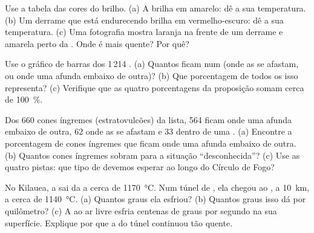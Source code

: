 \begin{exercise}[$\star$]\label{exo:g7:volcanoes:4}
Use a tabela das cores do brilho. (a) A  brilha em amarelo: dê a sua
temperatura. (b) Um derrame que está endurecendo brilha em vermelho-escuro:
dê a sua temperatura. (c) Uma fotografia mostra  laranja na frente de
um derrame e  amarela perto da . Onde é mais quente? Por quê?
\end{exercise}

\begin{exercise}[$\star\star$]\label{exo:g7:volcanoes:5}
Use o gráfico de barras dos 1\,214 . (a) Quantos  ficam num
 (onde as  se afastam, ou onde uma afunda embaixo de
outra)? (b) Que porcentagem de todos os  isso representa?
(c) Verifique que as quatro porcentagens da proposição somam cerca de
100~\%.
\end{exercise}

\begin{exercise}[$\star\star$]\label{exo:g7:volcanoes:6}
Dos 660 cones íngremes (estratovulcões) da lista, 564 ficam onde uma 
afunda embaixo de outra, 62 onde as  se afastam e 33 dentro de uma
. (a) Encontre a porcentagem de cones íngremes que ficam onde uma
 afunda embaixo de outra. (b) Quantos cones íngremes sobram para a
situação ``desconhecida''? (c) Use as quatro pistas: que tipo de 
devemos esperar ao longo do Círculo de Fogo?
\end{exercise}

\begin{exercise}[$\star\star$]\label{exo:g7:volcanoes:7}
No Kilauea, a  sai da  a cerca de \qty{1170}{\degreeCelsius}. Num
túnel de , ela chegou ao , a \qty{10}{km}, a cerca de
\qty{1140}{\degreeCelsius}. (a) Quantos graus ela esfriou? (b) Quantos
graus isso dá por quilômetro? (c) A  ao ar livre esfria centenas de
graus por segundo na sua superfície. Explique por que a  do túnel
continuou tão quente.
\end{exercise}

